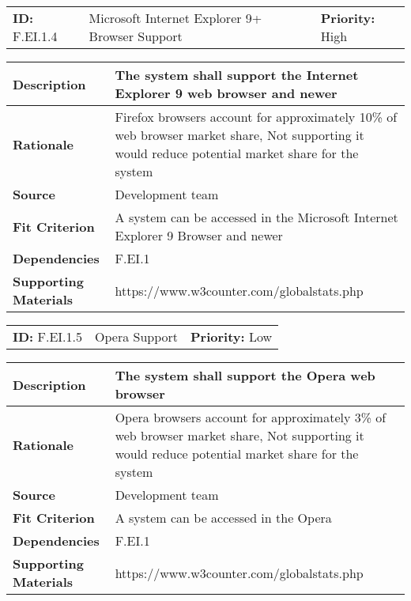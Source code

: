 \begin{table}[H]
    \begin{tabularx}{\textwidth}{| l | X | l |}
        \hline
        \textbf{ID:} F.EI.1.4 & Microsoft Internet Explorer 9+ Browser Support & \textbf{Priority:} High \\
    \end{tabularx}
    \begin{tabularx}{\textwidth}{| l | X |}
        \hline
        \textbf{Description} & The system shall support the Internet Explorer 9 web browser and newer \\ \hline
        \textbf{Rationale} & Firefox browsers account for approximately 10\% of web browser market share, Not supporting it would reduce potential market share for the system\\ \hline
        \textbf{Source} &  Development team\\ \hline
        \textbf{Fit Criterion} & A system can be accessed in the Microsoft Internet Explorer 9 Browser and newer  \\ \hline
        \textbf{Dependencies} & F.EI.1 \\ \hline
        \textbf{Supporting Materials} & https://www.w3counter.com/globalstats.php \\ \hline
    \end{tabularx}
\end{table}

\begin{table}[H]
    \begin{tabularx}{\textwidth}{| l | X | l |}
        \hline
        \textbf{ID:} F.EI.1.5 & Opera Support & \textbf{Priority:} Low \\
    \end{tabularx}
    \begin{tabularx}{\textwidth}{| l | X |}
        \hline
        \textbf{Description} & The system shall support the Opera web browser \\ \hline
        \textbf{Rationale} & Opera browsers account for approximately 3\% of web browser market share, Not supporting it would reduce potential market share for the system\\ \hline
        \textbf{Source} &  Development team\\ \hline
        \textbf{Fit Criterion} & A system can be accessed in the Opera  \\ \hline
        \textbf{Dependencies} & F.EI.1 \\ \hline
        \textbf{Supporting Materials} & https://www.w3counter.com/globalstats.php \\ \hline
    \end{tabularx}
\end{table}

